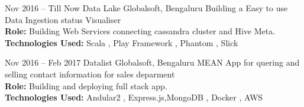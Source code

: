 \documentclass[]{friggeri-cv} %
\begin{document}
\begin{entrylist}
\entry
{Nov 2016 -- Till Now}
{Data Lake}
{Globalsoft, Bengaluru}
{Building a Easy to use Data Ingestion status Visualiser \\
\textbf{Role:} Building Web Services connecting cassandra cluster and Hive Meta.\\
\textbf{Technologies Used:} Scala , Play Framework , Phantom , Slick }
\end{entrylist}

\begin{entrylist}
\entry
{Nov 2016 -- Feb 2017}
{Datalist}
{Globalsoft, Bengaluru}
{MEAN App for quering and selling contact information for sales deparment \\
\textbf{Role:} Building and deploying full stack app.\\
\textbf{Technologies Used:} Andular2 , Express.js,MongoDB , Docker , AWS  }
\end{entrylist}
\end{document}
